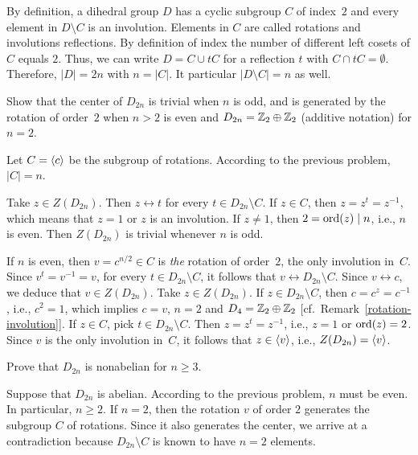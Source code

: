 \begin{solution} By definition, a dihedral group $D$ has a cyclic subgroup $C$ of index~$2$ and every element in $D\setminus C$ is an involution. Elements in $C$ are called rotations and involutions reflections. By definition of index the number of different left cosets of $C$ equals $2$. Thus, we can write $D=C\cup tC$ for a reflection $t$ with $C\cap tC=\emptyset$. Therefore, $|D|=2n$ with $n=|C|$. It particular $|D\setminus C|=n$ as well.  \end{solution} 

\begin{probl}
    Show that the center of\/ $D_{2n}$ is trivial when\/ $n$ is odd, and is generated by the rotation of order~$2$ when\/ $n>2$ is even and $D_{2n}=\mathbb{Z}_2\oplus\mathbb{Z}_2$ (additive notation) for\/ $n=2$.
\end{probl}

\begin{solution} Let $C=\langle c\rangle$ be the subgroup of rotations. According to the previous problem, $|C|=n$.

Take $z\in Z(D_{2n})$. Then $z\leftrightarrow t$ for every $t\in D_{2n}\setminus C$. If $z\in C$, then $z=z^t=z^{-1}$, which means that $z=1$ or $z$ is an involution. If $z\ne1$, then $2={\rm ord}(z)\mid n$, i.e., $n$ is even. Then $Z(D_{2n})$ is trivial whenever $n$ is odd.

If $n$ is even, then $v=c^{n/2}\in C$ is \textsl{the\/} rotation of order~$2$, the only involution in~$C$. Since $v^t=v^{-1}=v$, for every $t\in D_{2n}\setminus C$, it follows that $v\leftrightarrow D_{2n}\setminus C$. Since $v\leftrightarrow c$, we deduce that $v\in Z(D_{2n})$. Take $z\in Z(D_{2n})$. If $z\in D_{2n}\setminus C$, then $c=c^z=c^{-1}$, i.e., $c^2=1$, which implies $c=v$, $n=2$ and $D_4=\mathbb{Z}_2\oplus\mathbb{Z}_2$ [cf.~Remark~\ref{rotation-involution}]. If $z\in C$, pick $t\in D_{2n}\setminus C$. Then $z=z^t=z^{-1}$, i.e., $z=1$ or ${\rm ord}(z)=2$. Since $v$ is the only involution in~$C$, it follows that $z\in\langle v\rangle$, i.e., $Z(D_{2n})=\langle v\rangle$.  \end{solution}

\begin{probl}
    Prove that $D_{2n}$ is nonabelian for $n \geq 3$.    
\end{probl}

\begin{solution} Suppose that $D_{2n}$ is abelian. According to the previous problem, $n$ must be even. In particular, $n\ge2$. If $n=2$, then the rotation $v$ of order $2$ generates the subgroup $C$ of rotations. Since it also generates the center, we arrive at a contradiction because $D_{2n}\setminus C$ is known to have $n=2$ elements.  \end{solution}

